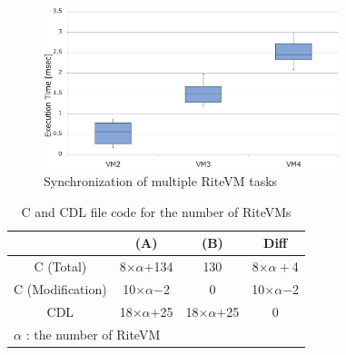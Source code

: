 \documentclass{sig-alternate-05-2015}
\begin{document}
 \begin{figure}[t]
    \centering
    \includegraphics[width=8.6cm,clip]{figure/eval_synchronization.eps}
    \vspace{0.5mm}
\caption{Synchronization of multiple RiteVM tasks}
    \vspace{1mm}
\label{fig:eval_synchronization}
\end{figure}

\begin{table}[t]
    \centering
    \vspace{1mm}
    \caption{C and CDL file code for the number of RiteVMs}
    \vspace{1mm}
    {\tabcolsep=0.2cm
    \begin{tabular}{c||c|c|c}
                & (A)       & (B)     & Diff  \\ \hline
        C (Total)      & 8$\times$$\alpha$$+$134  & 130     & 8$\times$$\alpha+$4\\
        C (Modification)   & 10$\times\alpha$$-$2 & 0   &  10$\times\alpha$$-$2 \\
        CDL    & 18$\times$$\alpha$$+$25   & 18$\times$$\alpha$$+$25 & 0     \\
        \multicolumn{3}{l}{{\small $\alpha$} : {\scriptsize the number of RiteVM}}
    \end{tabular}
    }
    \label{tab:codesize}
\end{table}
\end{document}
